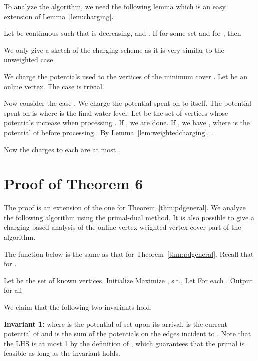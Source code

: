 \documentclass{article}
\begin{document}
To analyze the algorithm, we need the following lemma which is an easy extension of Lemma~\ref{lem:charging}.

\begin{lemma}
\label{lem:weightedcharging}
Let  be continuous such that  is decreasing, and . If  for some set  and  for , then

\end{lemma}

We only give a sketch of the charging scheme as it is very similar to the unweighted case.

We charge the potentials used to the vertices of the minimum cover . Let  be an online vertex. The case  is trivial.

Now consider the case . We charge the potential spent on  to  itself. The potential spent on  is  where  is the final water level. 
Let  be the set of vertices whose potentials increase when processing .
If , we are done. If , we have , where  is the potential of  before processing . By Lemma~\ref{lem:weightedcharging}, .

Now the charges to each  are at most .

\section{ Proof of Theorem 6}
The proof is an extension of the one for Theorem~\ref{thm:pdgeneral}. We analyze the following algorithm using the primal-dual method. It is also possible to give a charging-based analysis of the online vertex-weighted vertex cover part of the algorithm.

The function  below is the same as that for Theorem~\ref{thm:pdgeneral}. Recall that  for .

\begin{algorithm}[h!]
\SetAlgoLined
\caption{}
\label{alg:general greedy weighted}
Let  be the set of known vertices. Initialize \;
{
Maximize , s.t., \;
Let \;
{
\;
\;
}
For each , \;
\;
\;
}
Output  for all \;
\end{algorithm}

We claim that the following two invariants hold:

\textbf{Invariant 1:}  where  is the potential of  set upon its arrival,  is the current potential of  and  is the sum of the potentials on the edges incident to . Note that the LHS is at most 1  by the definition of , which guarantees that the primal is feasible as long as the invariant holds.
\end{document}
